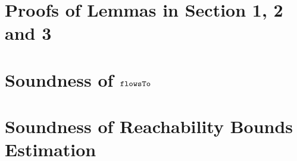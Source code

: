 
\section{Proofs of Lemmas in Section 1, 2 and 3}
\label{apdx:lemma_sec123}

\clearpage
\section{Soundness of $\mathtt{flowsTo}$}
\label{apdx:flowsto_soundness_extend}

\clearpage
\section{Soundness of Reachability Bounds Estimation}
\label{apdx:reachability_soundness}

\clearpage

